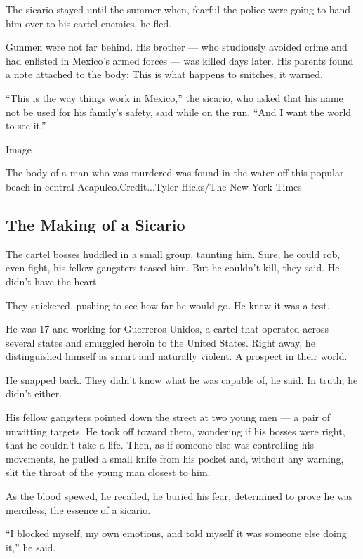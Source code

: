 The sicario stayed until the summer when, fearful the police were going
to hand him over to his cartel enemies, he fled.

Gunmen were not far behind. His brother --- who studiously avoided crime
and had enlisted in Mexico's armed forces --- was killed days later. His
parents found a note attached to the body: This is what happens to
snitches, it warned.

``This is the way things work in Mexico,'' the sicario, who asked that
his name not be used for his family's safety, said while on the run.
``And I want the world to see it.''

Image

The body of a man who was murdered was found in the water off this
popular beach in central Acapulco.Credit...Tyler Hicks/The New York
Times

\hypertarget{the-making-of-a-sicario}{%
\subsection{The Making of a Sicario}\label{the-making-of-a-sicario}}

The cartel bosses huddled in a small group, taunting him. Sure, he could
rob, even fight, his fellow gangsters teased him. But he couldn't kill,
they said. He didn't have the heart.

They snickered, pushing to see how far he would go. He knew it was a
test.

He was 17 and working for Guerreros Unidos, a cartel that operated
across several states and smuggled heroin to the United States. Right
away, he distinguished himself as smart and naturally violent. A
prospect in their world.

He snapped back. They didn't know what he was capable of, he said. In
truth, he didn't either.

His fellow gangsters pointed down the street at two young men --- a pair
of unwitting targets. He took off toward them, wondering if his bosses
were right, that he couldn't take a life. Then, as if someone else was
controlling his movements, he pulled a small knife from his pocket and,
without any warning, slit the throat of the young man closest to him.

As the blood spewed, he recalled, he buried his fear, determined to
prove he was merciless, the essence of a sicario.

``I blocked myself, my own emotions, and told myself it was someone else
doing it,'' he said.

